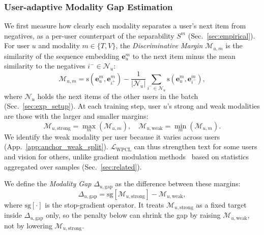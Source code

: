 \subsubsection{\textbf{User-adaptive Modality Gap Estimation}}
We first measure how clearly each modality separates a user's next item from negatives, as a per-user counterpart of the separability $S^m$ (Sec.~\ref{sec:empirical}).
For user $u$ and modality $m\in\{T, V\}$, the \textit{Discriminative Margin} $\mathcal{M}_{u,m}$ is the similarity of the sequence embedding $\mathbf{e}_u^m$ to the next item minus the mean similarity to the negatives $i^-\in\mathcal{N}_u$:
\begin{equation}
    \mathcal{M}_{u,m} = \text{s}(\mathbf{e}^m_u, \mathbf{e}^m_{i^+}) - \frac{1}{|\mathcal{N}_u|} \sum_{i^- \in \mathcal{N}_u} \text{s}(\mathbf{e}^m_u, \mathbf{e}^m_{i^-}),
\end{equation}
where $\mathcal{N}_u$ holds the next items of the other users in the batch (Sec.~\ref{sec:exp_setup}).
At each training step, user $u$'s strong and weak modalities are those with the larger and smaller margins:
\begin{equation}
    \mathcal{M}_{u,\text{strong}} = \max_{m}(\mathcal{M}_{u,m}), \quad \mathcal{M}_{u,\text{weak}} = \min_{m}(\mathcal{M}_{u,m}).
\end{equation}
We identify the weak modality per user because it varies across users (App.~\ref{app:anchor_weak_split}).
$\mathcal{L}_{\text{WPCL}}$ can thus strengthen text for some users and vision for others, unlike gradient modulation methods~\cite{modality_balancing_OGM-GE_1, modality_balancing_AGM_2} based on statistics aggregated over samples (Sec.~\ref{sec:related}).

We define the \textit{Modality Gap} $\Delta_{u,\mathrm{gap}}$ as the difference between these margins:
\begin{equation}
    \Delta_{u,\mathrm{gap}} = \mathrm{sg}[\mathcal{M}_{u,\text{strong}}] - \mathcal{M}_{u,\text{weak}},
    \label{eq:modality_gap}
\end{equation}
where $\mathrm{sg}[\cdot]$ is the stop-gradient operator.
It treats $\mathcal{M}_{u,\text{strong}}$ as a fixed target inside $\Delta_{u,\mathrm{gap}}$ only, so the penalty below can shrink the gap by raising $\mathcal{M}_{u,\text{weak}}$, not by lowering $\mathcal{M}_{u,\text{strong}}$.



